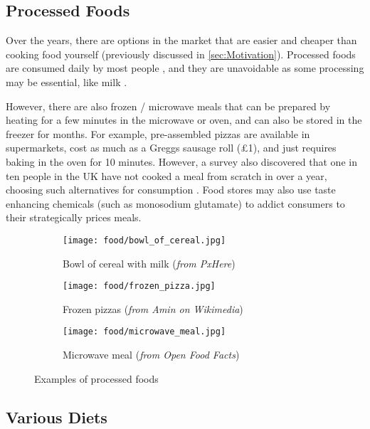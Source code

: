 \documentclass[../main.tex]{subfiles}
\begin{document}
\subsection{Processed Foods}

Over the years, there are options in the market that are easier and cheaper than cooking food yourself (previously discussed in \ref{sec:Motivation}). Processed foods are consumed daily by most people \cite{bbcShockingTransformationUK2021,HowBritsEating,rauberUltraprocessedFoodConsumption2020a}, and they are unavoidable as some processing may be essential, like milk \cite{EatingProcessedFoods2022}.

However, there are also frozen / microwave meals that can be prepared by heating for a few minutes in the microwave or oven, and can also be stored in the freezer for months. For example, pre-assembled pizzas are available in supermarkets, cost as much as a Greggs sausage roll (£1), and just requires baking in the oven for 10 minutes. However, a survey also discovered that one in ten people in the UK have not cooked a meal from scratch in over a year, choosing such alternatives for consumption \cite{alexanderOneTenPeople2019}. Food stores may also use taste enhancing chemicals (such as monosodium glutamate) to addict consumers to their strategically prices meals.

\begin{figure}
    \centering
    \noindent\begin{subfigure}{.3\textwidth}
    \texttt{[image: food/bowl\_of\_cereal.jpg]}
    \caption{Bowl of cereal with milk (\textit{from PxHere})}
    \end{subfigure}\hfill
    \begin{subfigure}{.3\textwidth}
    \texttt{[image: food/frozen\_pizza.jpg]}
    \caption{Frozen pizzas (\textit{from Amin on Wikimedia})}
    \end{subfigure}\hfill
    \begin{subfigure}{.3\textwidth}
    \texttt{[image: food/microwave\_meal.jpg]}
    \caption{Microwave meal (\textit{from Open Food Facts})}
    \end{subfigure}
    \caption{Examples of processed foods}
\end{figure}

\subsection{Various Diets}
\end{document}
